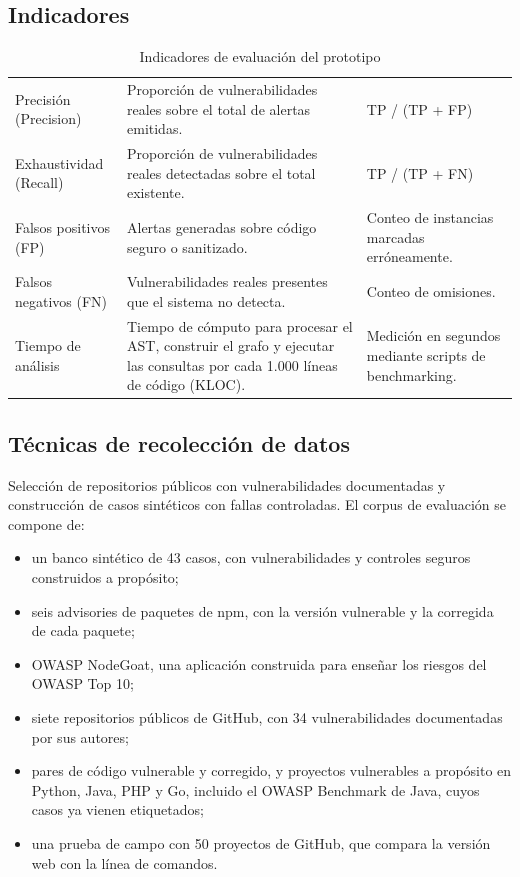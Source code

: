 \subsection{Indicadores}\label{sec:n2.3.1}

\begin{table}[H]
    \centering
    \caption{Indicadores de evaluación del prototipo}
    \label{tab:indicadores}
    \small
    \begin{tabularx}{\textwidth}{l L L}
        \toprule
         &  &  \\
        \midrule
        Precisión (Precision) & Proporción de vulnerabilidades reales sobre el total de alertas emitidas. & TP / (TP + FP) \\
        Exhaustividad (Recall) & Proporción de vulnerabilidades reales detectadas sobre el total existente. & TP / (TP + FN) \\
        Falsos positivos (FP) & Alertas generadas sobre código seguro o sanitizado. & Conteo de instancias marcadas erróneamente. \\
        Falsos negativos (FN) & Vulnerabilidades reales presentes que el sistema no detecta. & Conteo de omisiones. \\
        Tiempo de análisis & Tiempo de cómputo para procesar el AST, construir el grafo y ejecutar las consultas por cada 1.000 líneas de código (KLOC). & Medición en segundos mediante scripts de benchmarking. \\
        \bottomrule
    \end{tabularx}
\end{table}

\subsection{Técnicas de recolección de datos}\label{sec:n2.3.2}

Selección de repositorios públicos con vulnerabilidades documentadas y construcción de casos sintéticos con fallas controladas. El corpus de evaluación se compone de:

\begin{itemize}
    \item un banco sintético de 43 casos, con vulnerabilidades y controles seguros construidos a propósito;
    \item seis advisories de paquetes de npm, con la versión vulnerable y la corregida de cada paquete;
    \item OWASP NodeGoat, una aplicación construida para enseñar los riesgos del OWASP Top 10;
    \item siete repositorios públicos de GitHub, con 34 vulnerabilidades documentadas por sus autores;
    \item pares de código vulnerable y corregido, y proyectos vulnerables a propósito en Python, Java, PHP y Go, incluido el OWASP Benchmark de Java, cuyos casos ya vienen etiquetados;
    \item una prueba de campo con 50 proyectos de GitHub, que compara la versión web con la línea de comandos.
\end{itemize}

